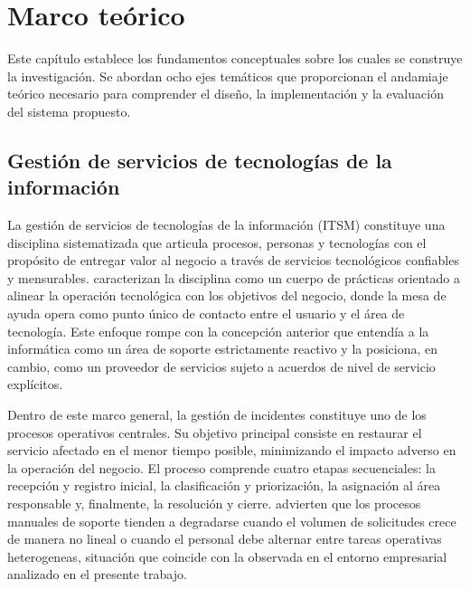 \section{Marco teórico}\label{sec:marco-teorico}

Este capítulo establece los fundamentos conceptuales sobre los cuales se construye la investigación. Se abordan ocho ejes temáticos que proporcionan el andamiaje teórico necesario para comprender el diseño, la implementación y la evaluación del sistema propuesto.

\subsection{Gestión de servicios de tecnologías de la información}\label{subsec:gestion-servicios-ti}

La gestión de servicios de tecnologías de la información (ITSM) constituye una disciplina sistematizada que articula procesos, personas y tecnologías con el propósito de entregar valor al negocio a través de servicios tecnológicos confiables y mensurables. \textcite{Galup2009_itsm} caracterizan la disciplina como un cuerpo de prácticas orientado a alinear la operación tecnológica con los objetivos del negocio, donde la mesa de ayuda opera como punto único de contacto entre el usuario y el área de tecnología. Este enfoque rompe con la concepción anterior que entendía a la informática como un área de soporte estrictamente reactivo y la posiciona, en cambio, como un proveedor de servicios sujeto a acuerdos de nivel de servicio explícitos.

Dentro de este marco general, la gestión de incidentes constituye uno de los procesos operativos centrales. Su objetivo principal consiste en restaurar el servicio afectado en el menor tiempo posible, minimizando el impacto adverso en la operación del negocio. El proceso comprende cuatro etapas secuenciales: la recepción y registro inicial, la clasificación y priorización, la asignación al área responsable y, finalmente, la resolución y cierre. \textcite{Galup2009_itsm} advierten que los procesos manuales de soporte tienden a degradarse cuando el volumen de solicitudes crece de manera no lineal o cuando el personal debe alternar entre tareas operativas heterogeneas, situación que coincide con la observada en el entorno empresarial analizado en el presente trabajo.

